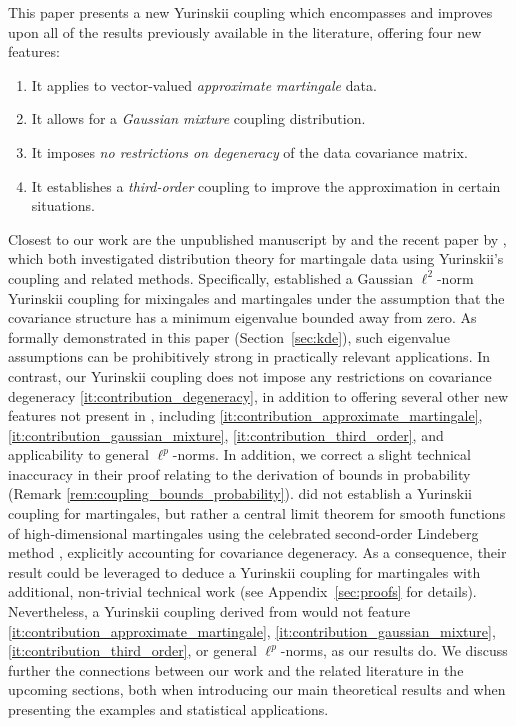 This paper presents a new Yurinskii coupling which encompasses and
improves upon all of the results previously available in the
literature, offering four new features:
%
\begin{enumerate}[label=(\roman*),leftmargin=*]
  \item
    \label{it:contribution_approximate_martingale}
    It applies to vector-valued
    \textit{approximate martingale} data.
  \item
    \label{it:contribution_gaussian_mixture}
    It allows for a \textit{Gaussian mixture} coupling distribution.
  \item
    \label{it:contribution_degeneracy}
    It imposes \textit{no restrictions on degeneracy} of the
    data covariance matrix.
  \item
    \label{it:contribution_third_order}
    It establishes a \textit{third-order} coupling to
    improve the approximation in certain situations.
\end{enumerate}
%

Closest to our work are the unpublished manuscript by
\citet{belloni2018high} and the recent paper by
\citet{li2020uniform},
which both investigated distribution theory for martingale
data using Yurinskii's coupling and related methods. Specifically,
\citet{li2020uniform}
established a Gaussian $\ell^2$-norm Yurinskii coupling for
mixingales and martingales under the assumption that the covariance structure
has a minimum eigenvalue bounded away from zero. As formally demonstrated in
this paper (Section~\ref{sec:kde}), such eigenvalue assumptions can be
prohibitively strong in practically relevant applications. In contrast, our
Yurinskii coupling does not impose any restrictions on covariance degeneracy
\ref{it:contribution_degeneracy}, in addition to offering several other new
features not present in \citet{li2020uniform}, including
\ref{it:contribution_approximate_martingale},
\ref{it:contribution_gaussian_mixture}, \ref{it:contribution_third_order}, and
applicability to general $\ell^p$-norms. In addition, we correct a slight
technical inaccuracy in their proof relating to the derivation of bounds in
probability (Remark \ref{rem:coupling_bounds_probability}).
\citet{belloni2018high} did not establish a Yurinskii coupling for
martingales, but rather a central limit theorem for smooth functions
of high-dimensional martingales
using the celebrated second-order Lindeberg method
\citep[see][and references therein]{chatterjee2006generalization},
explicitly accounting for covariance
degeneracy. As a consequence, their result could be leveraged to deduce a
Yurinskii coupling for martingales with additional, non-trivial technical work
(see Appendix~\ref{sec:proofs}
for details). Nevertheless, a
Yurinskii coupling derived from \citet{belloni2018high} would not feature
\ref{it:contribution_approximate_martingale},
\ref{it:contribution_gaussian_mixture}, \ref{it:contribution_third_order}, or
general $\ell^p$-norms, as our results do. We discuss
further the connections between our work and the related literature in the
upcoming sections, both when introducing our main theoretical results and when
presenting the examples and statistical applications.

